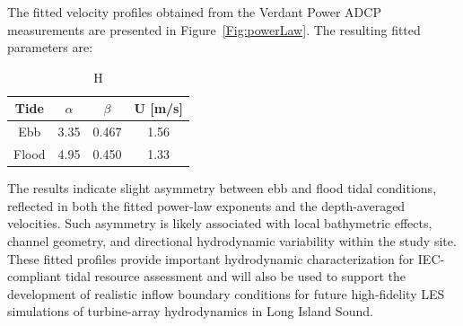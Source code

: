 \documentclass[12pt,sort&compress]{elsarticle}
\theoremstyle{definition}%
\begin{document}

The fitted velocity profiles obtained from the Verdant Power ADCP measurements are presented in Figure~\ref{Fig:powerLaw}. The resulting fitted parameters are:

\begin{table}[H]
\centering
\caption{H}
\label{tab:comp_det}
\begin{tabular}{cccc}
\hline
\textbf{Tide} & \textbf{$\alpha$} & \textbf{$\beta$} & \textbf{U [m/s]}\\
\hline
Ebb & 3.35 & 0.467 & 1.56 \\
Flood & 4.95 & 0.450 & 1.33 \\
\hline
\end{tabular}
\end{table}

The results indicate slight asymmetry between ebb and flood tidal conditions, reflected in both the fitted power-law exponents and the depth-averaged velocities. Such asymmetry is likely associated with local bathymetric effects, channel geometry, and directional hydrodynamic variability within the study site. These fitted profiles provide important hydrodynamic characterization for IEC-compliant tidal resource assessment and will also be used to support the development of realistic inflow boundary conditions for future high-fidelity LES simulations of turbine-array hydrodynamics in Long Island Sound.
\end{document}
